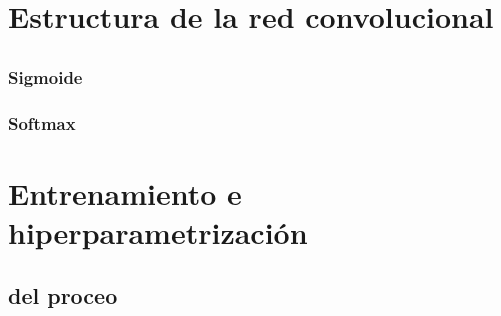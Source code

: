
\section{Estructura de la red convolucional}

\subsubsection{}

\subsection{}

\subsection{}

\subsubsection{Sigmoide}
\subsubsection{Softmax}


\section{Entrenamiento e hiperparametrización}

\subsection{ del proceo}

\subsection{}

\subsection{}

\subsection{}

